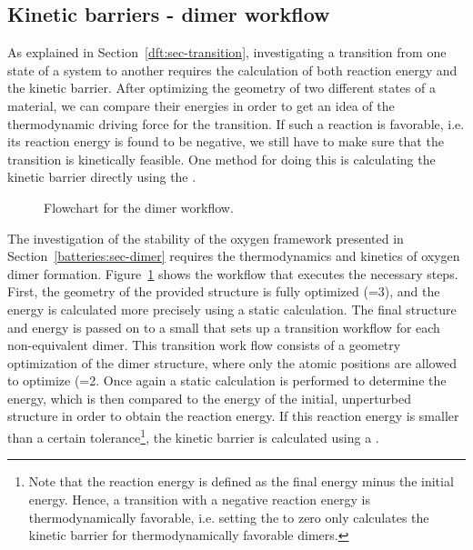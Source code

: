 \begin{refsection}
\subsection{Kinetic barriers - dimer workflow} \label{automation:sec-dimer} 
 
As explained in Section~\ref{dft:sec-transition}, investigating a transition 
from one state of a system to another requires the calculation of both 
reaction energy and the kinetic barrier. After optimizing the geometry of two 
different states of a material, we can compare their energies in order to get 
an idea of the thermodynamic driving force for the transition. If such a 
reaction is favorable, i.e. its reaction energy is found to be negative, we 
still have to make sure that the transition is kinetically feasible. One 
method for doing this is calculating the kinetic barrier directly using the 
. 
 
\begin{figure}[ht!] 
\centering 
 
\caption{\label{automation:fig-dimer} Flowchart for the dimer workflow.} 
\end{figure} 
 
The investigation of the stability of the oxygen framework presented in 
Section~\ref{batteries:sec-dimer} requires the thermodynamics and kinetics of 
oxygen dimer formation. Figure~\ref{automation:fig-dimer} shows the workflow 
that executes the necessary steps. First, the geometry of the provided 
structure is fully optimized (=3), and the energy is calculated 
more precisely using a static calculation. The final structure and energy is 
passed on to a small  that sets up a transition workflow
for each non-equivalent dimer. This transition work flow consists of a 
geometry optimization of the dimer structure, where only the atomic positions 
are allowed to optimize (=2. Once again a static calculation is 
performed to determine the energy, which is then compared to the energy of the 
initial, unperturbed structure in order to obtain the reaction energy. If this 
reaction energy is smaller than a certain tolerance\footnote{Note that the reaction energy is defined as the final energy minus the initial energy. Hence, a transition with a negative reaction energy is thermodynamically favorable, i.e. setting the  to zero only calculates the kinetic barrier for thermodynamically favorable dimers.}, the kinetic barrier is 
calculated using a . 


\end{refsection}
